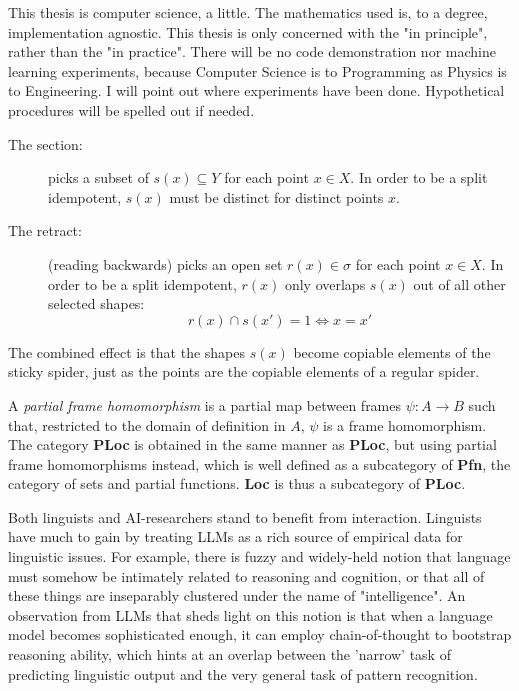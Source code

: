This thesis is computer science, a little.
The mathematics used is, to a degree, implementation agnostic.
This thesis is only concerned with the "in principle", rather than the "in practice".
There will be no code demonstration nor machine learning experiments, because
Computer Science is to Programming as Physics is to Engineering.
I will point out where experiments have been done.
Hypothetical procedures will be spelled out if needed.





\begin{description}
\item[The section:]{picks a subset of $s(x) \subseteq Y$ for each point $x \in X$. In order to be a split idempotent, $s(x)$ must be distinct for distinct points $x$.}
\item[The retract:]{(reading backwards) picks an open set $r(x) \in \sigma$ for each point $x \in X$. In order to be a split idempotent, $r(x)$ only overlaps $s(x)$ out of all other selected shapes: \[r(x) \cap s(x') = 1 \iff x = x'\]}
\end{description}
The combined effect is that the shapes $s(x)$ become copiable elements of the sticky spider, just as the points are the copiable elements of a regular spider.


\begin{defn}
A \emph{partial frame homomorphism} is a partial map between frames $\psi: A \rightarrow B$ such that, restricted to the domain of definition in $A$, $\psi$ is a frame homomorphism. The category \textbf{PLoc} is obtained in the same manner as \textbf{PLoc}, but using partial frame homomorphisms instead, which is well defined as a subcategory of \textbf{Pfn}, the category of sets and partial functions. \textbf{Loc} is thus a subcategory of \textbf{PLoc}.
\end{defn}



Both linguists and AI-researchers stand to benefit from interaction. Linguists have much to gain by treating LLMs as a rich source of empirical data for linguistic issues. For example, there is fuzzy and widely-held notion that language must somehow be intimately related to reasoning and cognition, or that all of these things are inseparably clustered under the name of "intelligence". An observation from LLMs that sheds light on this notion is that when a language model becomes sophisticated enough, it can employ chain-of-thought \citep{wei_chain--thought_2023} to bootstrap reasoning ability, which hints at an overlap between the 'narrow' task of predicting linguistic output and the very general task of pattern recognition. 


